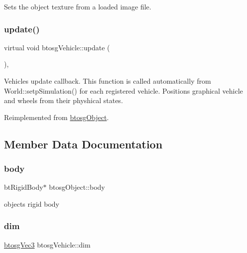 Sets the object texture from a loaded image file. \mbox{\label{classbtosgVehicle_a5fd0f471df492ac232c9b772a28bd2b9}} 
\subsubsection{\texorpdfstring{update()}{update()}}
{\footnotesize\ttfamily virtual void btosg\+Vehicle\+::update (\begin{DoxyParamCaption}{ }\end{DoxyParamCaption})\hspace{0.3cm}{\ttfamily [inline]}, {\ttfamily [virtual]}}

Vehicle\textquotesingle{}s update callback. This function is called automatically from World\+::setp\+Simulation() for each registered vehicle. Positions graphical vehicle and wheels from their physhical states. 

Reimplemented from \hyperlink{classbtosgObject_a342917817dfde62554f83da8e0d5110b}{btosg\+Object}.



\subsection{Member Data Documentation}
\mbox{\label{classbtosgObject_a64ccde0543c184ed1749fdb9c9699785}} 
\subsubsection{\texorpdfstring{body}{body}}
{\footnotesize\ttfamily bt\+Rigid\+Body$\ast$ btosg\+Object\+::body\hspace{0.3cm}{\ttfamily [inherited]}}



object\textquotesingle{}s rigid body 

\mbox{\label{classbtosgVehicle_a2173f99ca0719929aa5a1c890927aca3}} 
\subsubsection{\texorpdfstring{dim}{dim}}
{\footnotesize\ttfamily \hyperlink{classbtosgVec3}{btosg\+Vec3} btosg\+Vehicle\+::dim}



